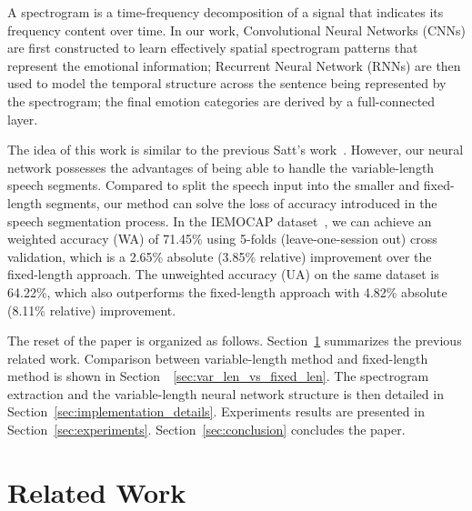 \documentclass[a4paper]{article}
\begin{document}
A spectrogram is a time-frequency decomposition of a signal that indicates its frequency content over time. In our work, Convolutional Neural Networks (CNNs) are first constructed to learn effectively spatial spectrogram patterns that represent the emotional information; Recurrent Neural Network (RNNs) are then used to model the temporal structure across the sentence being represented by the spectrogram; the final emotion categories are derived by a full-connected layer.

The idea of this work is similar to the previous Satt's work~\cite{satt2017}. However, our neural network possesses the advantages of being able to handle the variable-length speech segments. Compared to split the speech input into the smaller and fixed-length segments, our method can solve the loss of accuracy introduced in the speech segmentation process. In the IEMOCAP dataset~\cite{busso2008}, we can achieve an weighted accuracy (WA) of 71.45\% using 5-folds (leave-one-session out) cross validation, which is a 2.65\% absolute (3.85\% relative) improvement over the fixed-length approach. The unweighted accuracy (UA) on the same dataset is 64.22\%, which also outperforms the fixed-length approach with 4.82\% absolute (8.11\% relative) improvement.

The reset of the paper is organized as follows. Section~\ref{sec:related_work} summarizes the previous related work. Comparison between variable-length method and fixed-length method is shown in Section~~\ref{sec:var_len_vs_fixed_len}. The spectrogram extraction and the variable-length neural network structure is then detailed in Section~\ref{sec:implementation_details}. Experiments results are presented in Section~\ref{sec:experiments}. Section~\ref{sec:conclusion} concludes the paper.

\section{Related Work}
\label{sec:related_work}

\end{document}
